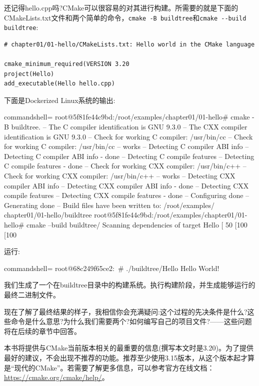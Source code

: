 还记得hello.cpp吗?CMake可以很容易的对其进行构建。所需要的就是下面的CMakeLists.txt文件和两个简单的命令，\texttt{cmake -B buildtree}和\texttt{cmake -{}-build buildtree}:

\begin{lstlisting}[style=styleCMake]
# chapter01/01-hello/CMakeLists.txt: Hello world in the CMake language
	
cmake_minimum_required(VERSION 3.20
project(Hello)
add_executable(Hello hello.cpp)
\end{lstlisting}

下面是Dockerized Linux系统的输出:

\begin{tcblisting}{commandshell={}}
root@5f81fe44c9bd:/root/examples/chapter01/01-hello# cmake
-B buildtree.
-- The C compiler identification is GNU 9.3.0
-- The CXX compiler identification is GNU 9.3.0
-- Check for working C compiler: /usr/bin/cc
-- Check for working C compiler: /usr/bin/cc -- works
-- Detecting C compiler ABI info
-- Detecting C compiler ABI info - done
-- Detecting C compile features
-- Detecting C compile features - done
-- Check for working CXX compiler: /usr/bin/c++
-- Check for working CXX compiler: /usr/bin/c++ -- works
-- Detecting CXX compiler ABI info
-- Detecting CXX compiler ABI info - done
-- Detecting CXX compile features
-- Detecting CXX compile features - done
-- Configuring done
-- Generating done
-- Build files have been written to: /root/examples/
chapter01/01-hello/buildtree
root@5f81fe44c9bd:/root/examples/chapter01/01-hello# cmake
--build buildtree/
Scanning dependencies of target Hello
[ 50%
[100%
[100%
\end{tcblisting}

运行:

\begin{tcblisting}{commandshell={}}
root@68c249f65ce2:~# ./buildtree/Hello
Hello World!
\end{tcblisting}

我们生成了一个在buildtree目录中的构建系统。执行构建阶段，并生成能够运行的最终二进制文件。

现在了解了最终结果的样子，我相信你会充满疑问:这个过程的先决条件是什么?这些命令是什么意思?为什么我们需要两个?如何编写自己的项目文件?——这些问题将在后续的章节中回答。

\begin{tcolorbox}[colback=blue!5!white,colframe=blue!75!black,title=寻求帮助]
本书将提供与CMake当前版本相关的最重要的信息(撰写本文时是3.20)。为了提供最好的建议，不会出现不推荐的功能。推荐至少使用3.15版本，从这个版本起才算是“现代的CMake”。若需要了解更多信息，可以参考官方在线文档：\url{https://cmake.org/cmake/help/}。
\end{tcolorbox}



















